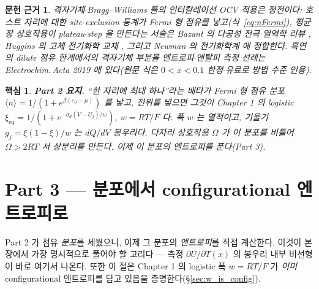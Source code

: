 \documentclass[11pt,a4paper]{article}
\newtheorem*{keybox}{핵심}
\newtheorem*{srcbox}{문헌 근거}
\newcommand{\eq}{\mathrm{eq}}
\newcommand{\avg}[1]{\langle #1\rangle}
\begin{document}
\begin{srcbox}
격자기체$\cdot$Bragg--Williams 틀의 인터칼레이션 OCV 적용은 정전이다: 호스트 자리에 대한 site-exclusion
통계가 Fermi 형 점유를 낳고(식~\eqref{eq:nFermi}), 평균장 상호작용이 plateau$\cdot$step 을 만든다는 서술은
Bazant 의 다공성 전극 열역학 리뷰 \cite{bazant2013}, Huggins 의 고체 전기화학 교재 \cite{huggins2009},
그리고 Newman 의 전기화학계 \cite{newman} 에 정합한다. 흑연의 dilute 점유 한계에서의 격자기체 부분몰
엔트로피$\cdot$엔탈피 측정 선례는 Electrochim.\,Acta 2019 \cite{occupation2019} 에 있다(원문 식은
$0<x<0.1$ 한정$\cdot$유료로 방법 수준 인용).
\end{srcbox}

\begin{keybox}
\textbf{Part 2 요지.} ``한 자리에 최대 하나''라는 배타가 Fermi 형 점유 분포 $\avg n=1/(1+e^{\beta(\varepsilon_0-\mu)})$
를 낳고, 전위를 넣으면 그것이 Chapter 1 의 logistic $\xi_\eq=1/(1+e^{-\sigma_d(V-U_j)/w})$, $w=RT/F$ 다.
폭 $w$ 는 열적이고, 기울기 $g_j=\xi(1-\xi)/w$ 는 $dQ/dV$ 봉우리다. 다자리 상호작용 $\Omega$ 가 이 분포를
비틀어 $\Omega>2RT$ 서 상분리를 만든다. 이제 \emph{이 분포의 엔트로피}를 푼다(Part 3).
\end{keybox}

\section*{Part 3 — 분포에서 configurational 엔트로피로}

Part 2 가 점유 \emph{분포}를 세웠으니, 이제 그 분포의 \emph{엔트로피}를 직접 계산한다. 이것이 본 장에서
가장 명시적으로 풀어야 할 고리다 — 측정 $\partial U/\partial T(x)$ 의 봉우리 내부 비선형이 바로 여기서
나온다. 또한 이 절은 Chapter 1 의 logistic 폭 $w=RT/F$ 가 \emph{이미} configurational 엔트로피를 담고
있음을 증명한다(\S\ref{sec:w_is_config}).
\end{document}
